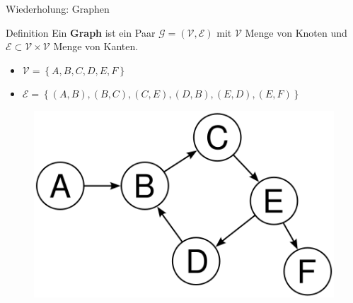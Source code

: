 \documentclass[18pt]{beamer}
\begin{document}
\begin{frame}{Wiederholung: Graphen}
        \begin{block}{Definition}
            Ein \textbf{Graph} ist ein Paar $\mathcal{G} = (\mathcal{V}, \mathcal{E})$
            mit $\mathcal{V}$ Menge von Knoten
            und $\mathcal{E} \subset \mathcal{V} \times \mathcal{V}$ Menge von Kanten.
        \end{block}
        \begin{exampleblock}{}
            \begin{itemize}
                \item $\mathcal{V} = \left\{ A, B, C, D, E, F \right\}$
                \item $\mathcal{E} = \left\{ (A, B), (B, C), (C, E), (D, B), (E, D), (E, F) \right\}$
            \end{itemize}
        \end{exampleblock}
        \begin{figure}
            \includegraphics[scale=.3]{img/graph.png}
        \end{figure}
\end{frame}
\end{document}
